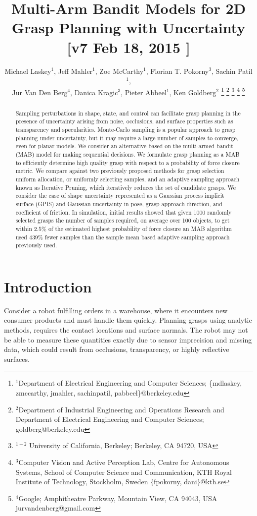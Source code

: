 \documentclass[10pt, conference]{ieeeconf}      %
\title{\LARGE \bf
Multi-Arm Bandit Models for 2D Grasp Planning with Uncertainty  [v7 Feb 18, 2015 ] }
\author{Michael Laskey$^1$, Jeff Mahler$^1$, Zoe McCarthy$^1$,  Florian T. Pokorny$^3$, Sachin Patil$^1$,\\ Jur Van Den Berg$^4$,  Danica Kragic$^3$, Pieter Abbeel$^1$, Ken Goldberg$^2$%
\thanks{$^1$Department of Electrical Engineering and Computer Sciences; {\small \{mdlaskey, zmccarthy, jmahler, sachinpatil, pabbeel\}@berkeley.edu}}%
\thanks{$^2$Department of Industrial Engineering and Operations Research and Department of Electrical Engineering and Computer Sciences; {\small goldberg@berkeley.edu}}%
\thanks{$^{1-2}$ University of California, Berkeley;  Berkeley, CA 94720, USA}%
\thanks{$^3$Computer Vision and Active Perception Lab, Centre for Autonomous Systems, School of Computer Science and Communication, KTH Royal Institute of Technology, Stockholm, Sweden {\small \{fpokorny, dani\}@kth.se}}%
\thanks{$^4$Google; Amphitheatre Parkway, Mountain View, CA 94043, USA {\small jurvandenberg@gmail.com}}%
}
\begin{document}
\maketitle
\thispagestyle{empty}
\pagestyle{empty}



\begin{abstract}
Sampling perturbations in shape, state, and control can facilitate grasp planning in the presence of uncertainty arising from noise, occlusions, and surface properties such as transparency and specularities. 
Monte-Carlo sampling is a popular approach to grasp planning under uncertainty, but it may require a large number of samples to converge, even for planar models.
We consider an alternative based on the multi-armed bandit (MAB) model for making sequential decisions.
We formulate grasp planning as a MAB  to efficiently determine high quality grasp with respect to a probability of force closure metric.
We compare against two previously proposed methods for grasp selection uniform allocation, or uniformly selecting samples, and an adaptive sampling approach known as Iterative Pruning, which iteratively reduces the set of candidate grasps. We consider the case of shape uncertainty represented as a Gaussian process implicit surface (GPIS) and Gaussian uncertainty in pose, grasp approach direction, and coefficient of friction.
In simulation, initial results  showed that given 1000 randomly selected grasps the number of samples required, on average over 100 objects, to get within $2.5\%$ of the estimated highest probability of force closure an MAB algorithm used $439\%$ fewer samples than the sample mean based adaptive sampling approach previously used.
\end{abstract}



\section{Introduction}



Consider a robot fulfilling orders in a warehouse, where it encounters new consumer products and must handle them quickly. Planning grasps using analytic methods, requires the contact locations and surface normals. The robot may not be able to measure these quantities exactly due to sensor imprecision and missing data, which could result from occlusions, transparency, or highly reflective surfaces. 
\end{document}
